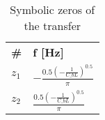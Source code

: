 \begin{table}[H]
\centering
\begin{tabular}[c]{ll}
\textbf{\#} & \textbf{f [Hz]} \\ 
\rowcolor{myyellow}
$z_{1}$ &\small{$- \frac{0.5 \left(- \frac{1}{C\_{b} L}\right)^{0.5}}{\pi}$} \\ 
$z_{2}$ &\small{$\frac{0.5 \left(- \frac{1}{C\_{b} L}\right)^{0.5}}{\pi}$} \\ 
\end{tabular}
\caption{Symbolic zeros of the transfer}
\label{tab-symzeros}
\end{table}

